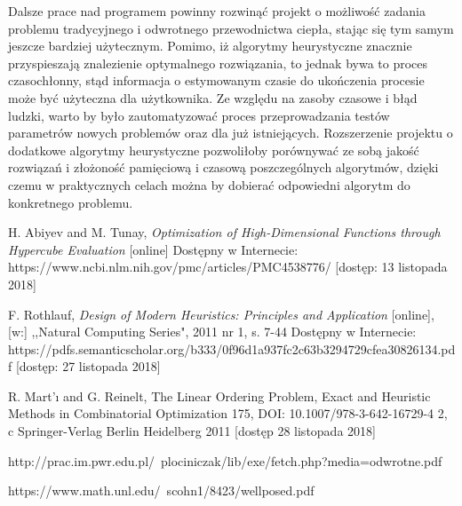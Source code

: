 \documentclass[twoside]{projektInzynierskiMS1}
\newcommand{\si}{ś}
\begin{document}
Dalsze prace nad programem powinny rozwinąć projekt o możliwo\si ć zadania problemu tradycyjnego i odwrotnego przewodnictwa ciepła, stając się tym samym jeszcze bardziej użytecznym. Pomimo, iż algorytmy heurystyczne znacznie przyspieszają znalezienie optymalnego rozwiązania, to jednak bywa to proces czasochłonny, stąd informacja o estymowanym czasie do ukończenia procesie może być użyteczna dla użytkownika. Ze względu na zasoby czasowe i błąd ludzki, warto by było zautomatyzować proces przeprowadzania testów parametrów nowych problemów oraz dla już istniejących. Rozszerzenie projektu o dodatkowe algorytmy heurystyczne pozwoliłoby porównywać ze sobą jako\si ć rozwiązań i złożono\si ć pamięciową i czasową poszczególnych algorytmów, dzięki czemu w praktycznych celach można by dobierać odpowiedni algorytm do konkretnego problemu.


\begin{thebibliography}{12}

 H. Abiyev and M. Tunay, \textit{Optimization of High-Dimensional Functions through Hypercube Evaluation} [online] Dostępny w Internecie: https://www.ncbi.nlm.nih.gov/pmc/articles/PMC4538776/ [dostęp: 13 listopada 2018]


 F. Rothlauf, \textit{Design of Modern Heuristics: Principles and Application} [online], [w:] ,,Natural Computing Series", 2011 nr 1, s. 7-44
Dostępny w Internecie: https://pdfs.semanticscholar.org/b333/0f96d1a937fc2c63b3294729cfea30826134.pdf [dostęp: 27 listopada 2018]

 R. Mart'ı and G. Reinelt, The Linear Ordering Problem, Exact and Heuristic Methods
in Combinatorial Optimization 175, DOI: 10.1007/978-3-642-16729-4 2,
c Springer-Verlag Berlin Heidelberg 2011
[dostęp 28 listopada 2018]

http://prac.im.pwr.edu.pl/~plociniczak/lib/exe/fetch.php?media=odwrotne.pdf

https://www.math.unl.edu/~scohn1/8423/wellposed.pdf


\end{thebibliography}
\end{document}

